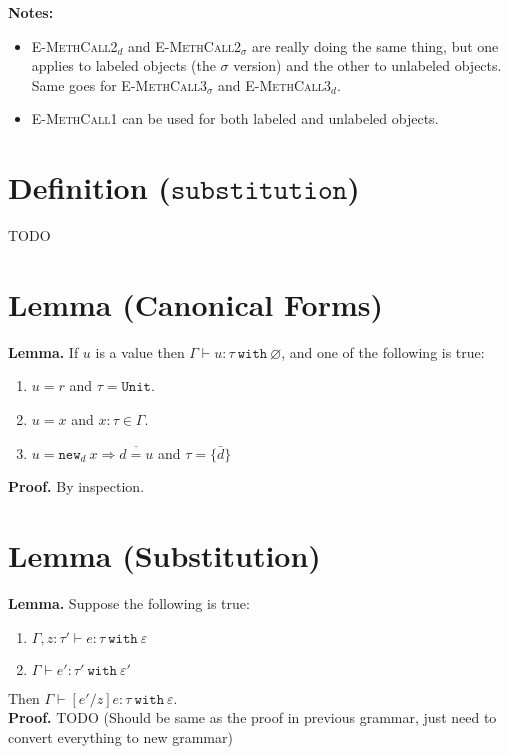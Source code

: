 \documentclass{llncs}
\newcommand{\keywadj}[1]{\mathtt{#1}}
\newcommand{\keyw}[1]{\keywadj{#1}~}
\newcommand{\kwa}[1]{\keywadj{ #1 }}
\newcommand{\type}[2]{
	#1~\keyw{with} #2
}
\newcommand{\newd}[0]{
	\keywadj{new}_d~x \Rightarrow \overline{d = u}
}
\begin{document}
\noindent \textbf{Notes:}
\begin{itemize}
	\item \textsc{E-MethCall2$_d$} and \textsc{E-MethCall2$_\sigma$} are really doing the same thing, but one applies to labeled objects (the $\sigma$ version) and the other to unlabeled objects. Same goes for \textsc{E-MethCall3$_\sigma$} and \textsc{E-MethCall3$_d$}.
	\item \textsc{E-MethCall1} can be used for both labeled and unlabeled objects.
\end{itemize}


\section{Definition ($\keywadj{substitution}$)}

TODO

\section{Lemma (Canonical Forms)}

\textbf{Lemma. } If $u$ is a value then $\Gamma \vdash u : \type{\tau}{\varnothing}$, and one of the following is true:
\begin{enumerate}
	\item $u = r$ and $\tau = \kwa{Unit}$.
	\item $u = x$ and $x : \tau \in \Gamma$.
	\item $u = \newd$ and $\tau = \{ \bar d \}$ 
\end{enumerate} 

\noindent
\textbf{Proof.} By inspection.

\section{Lemma (Substitution)}

\textbf{Lemma. } Suppose the following is true: 

\begin{enumerate}
	\item $\Gamma, z : \tau' \vdash e : \tau~\keyw{with} \varepsilon$
	\item $\Gamma \vdash e' : \tau'~\keyw{with} \varepsilon'$
\end{enumerate}
	
	\noindent
Then $\Gamma \vdash [e'/z]e : \tau~\keyw{with} \varepsilon$.\\

\noindent
\textbf{Proof.} TODO (Should be same as the proof in previous grammar, just need to convert everything to new grammar)
\end{document}
